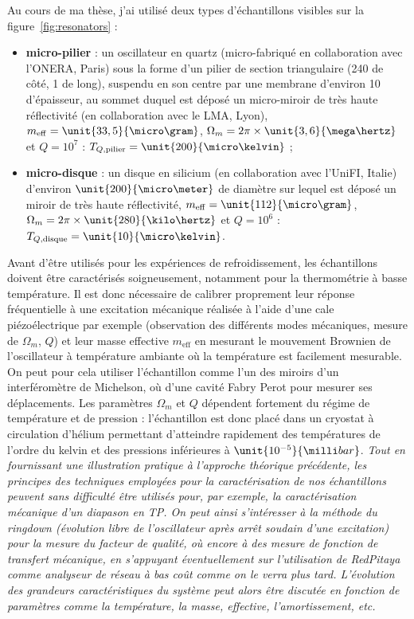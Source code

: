\documentclass[12pt,a4paper]{article}
\begin{document}
Au cours de ma thèse, j'ai utilisé deux types d'échantillons visibles sur la figure~\ref{fig:resonators} :
\begin{itemize}
\item \textbf{micro-pilier} : un oscillateur en quartz (micro-fabriqué en collaboration avec l'ONERA, Paris) sous la forme d'un pilier de section triangulaire (\unit{240}{\micro\meter} de côté, \unit{1}{\milli\meter} de long), suspendu en son centre par une membrane d'environ \unit{10}{\micro\meter} d'épaisseur, au sommet duquel est déposé un micro-miroir de très haute réflectivité (en collaboration avec le LMA, Lyon), $m_\mathrm{eff}=\unit{33,5}{\micro\gram}$, $\Omega_m=2\pi\times\unit{3,6}{\mega\hertz}$ et $Q=10^7$ : $T_{Q,\mathrm{pilier}} = \unit{200}{\micro\kelvin}$ ;
\item \textbf{micro-disque} : un disque en silicium (en collaboration avec l'UniFI, Italie) d'environ $\unit{200}{\micro\meter}$ de diamètre sur lequel est déposé un miroir de très haute réflectivité, $m_\mathrm{eff}=\unit{112}{\micro\gram}$, $\Omega_m=2\pi\times\unit{280}{\kilo\hertz}$ et $Q=10^6$ : $T_{Q,\mathrm{disque}} = \unit{10}{\micro\kelvin}$.
\end{itemize}
Avant d'être utilisés pour les expériences de refroidissement, les échantillons doivent être caractérisés soigneusement, notamment pour la thermométrie à basse température.
Il est donc nécessaire de calibrer proprement leur réponse fréquentielle à une excitation mécanique réalisée à l'aide d'une cale piézoélectrique par exemple (observation des différents modes mécaniques, mesure de $\Omega_m$, $Q$) et leur masse effective $m_\mathrm{eff}$ en mesurant le mouvement Brownien de l'oscillateur à température ambiante où la température est facilement mesurable.
On peut pour cela utiliser l'échantillon comme l'un des miroirs d'un interféromètre de Michelson, où d'une cavité Fabry Perot pour mesurer ses déplacements.
Les paramètres $\Omega_m$ et $Q$ dépendent fortement du régime de température et de pression  : l'échantillon est donc placé dans un cryostat à circulation d'hélium permettant d'atteindre rapidement des températures de l'ordre du kelvin et des pressions inférieures à $\unit{10^{-5}}{\milli bar}$.
\emph{Tout en fournissant une illustration pratique à l'approche théorique précédente, les principes des techniques employées pour la caractérisation de nos échantillons peuvent sans difficulté être utilisés pour, par exemple, la caractérisation mécanique d'un diapason en TP.
On peut ainsi s'intéresser à la méthode du ringdown (évolution libre de l'oscillateur après arrêt soudain d'une excitation) pour la mesure du facteur de qualité, où encore à des mesure de fonction de transfert mécanique, en s'appuyant éventuellement sur l'utilisation de RedPitaya comme analyseur de réseau à bas coût comme on le verra plus tard.
L'évolution des grandeurs caractéristiques du système peut alors être discutée en fonction de paramètres comme la température, la masse, effective, l'amortissement, etc.}
\end{document}
